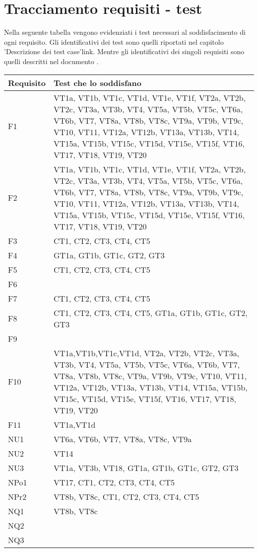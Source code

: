 \section{Tracciamento requisiti - test}
Nella seguente tabella vengono evidenziati i test necessari al soddisfacimento di ogni requisito. Gli identificativi dei test sono quelli riportati nel capitolo 'Descrizione dei test case'{link}. Mentre gli identificativi dei singoli requisiti sono quelli descritti nel documento \AR .
 \begin{center}
\begin{tabular}{|p{3cm}|p{8cm}|} \hline
\textbf{Requisito} & \textbf{Test che lo soddisfano}\\ \hline
F1  & VT1a, VT1b, VT1c, VT1d, VT1e, VT1f, VT2a, VT2b, VT2c, VT3a, VT3b, VT4, VT5a, VT5b, VT5c, VT6a, VT6b, VT7, VT8a, VT8b, VT8c, VT9a, VT9b, VT9c, VT10, VT11, VT12a, VT12b, VT13a, VT13b, VT14, VT15a, VT15b, VT15c, VT15d, VT15e, VT15f, VT16, VT17, VT18, VT19, VT20\\ \hline
F2  & VT1a, VT1b, VT1c, VT1d, VT1e, VT1f, VT2a, VT2b, VT2c, VT3a, VT3b, VT4, VT5a, VT5b, VT5c, VT6a, VT6b, VT7, VT8a, VT8b, VT8c, VT9a, VT9b, VT9c, VT10, VT11, VT12a, VT12b, VT13a, VT13b, VT14, VT15a, VT15b, VT15c, VT15d, VT15e, VT15f, VT16, VT17, VT18, VT19, VT20\\ \hline
F3  & CT1, CT2, CT3, CT4, CT5 \\ \hline
F4  & GT1a, GT1b, GT1c, GT2, GT3\\ \hline
F5  & CT1, CT2, CT3, CT4, CT5 \\ \hline
F6  &  \\ \hline
F7  & CT1, CT2, CT3, CT4, CT5  \\ \hline
F8  & CT1, CT2, CT3, CT4, CT5, GT1a, GT1b, GT1c, GT2, GT3  \\ \hline
F9  &  \\ \hline
F10 & VT1a,VT1b,VT1c,VT1d, VT2a, VT2b, VT2c, VT3a, VT3b, VT4, VT5a, VT5b, VT5c, VT6a, VT6b, VT7, VT8a, VT8b, VT8c, VT9a, VT9b, VT9c, VT10, VT11, VT12a, VT12b, VT13a, VT13b, VT14, VT15a, VT15b, VT15c, VT15d, VT15e, VT15f, VT16, VT17, VT18, VT19, VT20 \\ \hline
F11 & VT1a,VT1d \\ \hline
NU1 & VT6a, VT6b, VT7, VT8a, VT8c, VT9a\\ \hline
NU2 & VT14\\ \hline
NU3 & VT1a, VT3b, VT18, GT1a, GT1b, GT1c, GT2, GT3\\ \hline
NPo1 &  VT17, CT1, CT2, CT3, CT4, CT5 \\ \hline
NPr2 &  VT8b, VT8c, CT1, CT2, CT3, CT4, CT5 \\ \hline
NQ1 & VT8b, VT8c  \\ \hline
NQ2 &  \\ \hline
NQ3 &  \\ \hline
\end{tabular} \\
\end{center}


